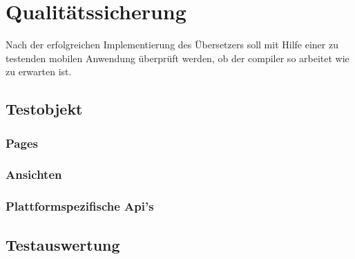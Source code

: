 \chapter{Qualitätssicherung}
\label{chap:Qualitätssicherung}

Nach der erfolgreichen Implementierung des Übersetzers soll mit Hilfe einer zu testenden mobilen Anwendung überprüft werden,  ob der compiler so arbeitet wie zu erwarten ist.  

\section{Testobjekt}
\subsection{Pages}
\subsection{Ansichten}
\subsection{Plattformspezifische Api's}
\section{Testauswertung}


